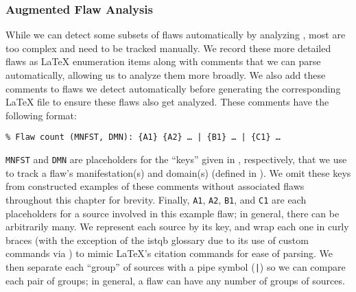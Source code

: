 \subsubsection{Augmented Flaw Analysis}\label{aug-flaw-analysis}
While we can detect some subsets of flaws automatically by analyzing
\ourApproachGlossary, most are too complex and need to be tracked manually. We
record these more detailed flaws as \LaTeX{} enumeration items along with
comments that we can parse automatically, allowing us to analyze them more
broadly. We also add these comments to flaws we detect automatically before
generating the corresponding \LaTeX{} file to ensure these flaws also get
analyzed. These comments have the following format:
\begin{displayquote}
    \texttt{\% Flaw count (MNFST, DMN): \{A1\} \{A2\} \dots{} | \{B1\} %
        \dots{} | \{C1\} \dots}
\end{displayquote}
\texttt{MNFST} and \texttt{DMN} are placeholders for the ``keys'' given in
, respectively, that we use to track a
flaw's manifestation(s) and domain(s) (defined in ). We omit
these keys from constructed examples of these comments without associated flaws
throughout this chapter for brevity. Finally, \texttt{A1}, \texttt{A2}, %
\texttt{B1}, and \texttt{C1} are each placeholders for a source involved in
this example flaw; in general, there can be arbitrarily many. We represent each
source by its \BibTeX{} key, and wrap each one in curly braces (with the
exception of the \acs{istqb} glossary due to its use of custom commands via
) to mimic \LaTeX{}'s citation commands for ease of parsing.
We then separate each ``group'' of sources with a pipe symbol (\texttt{|}) so
we can compare each pair of groups; in general, a flaw can have any number of
groups of sources.

